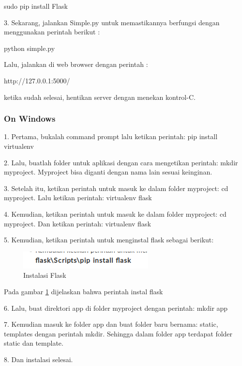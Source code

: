\documentclass[12pt,a4paper]{article}
\begin{document}
	sudo pip install Flask

3. Sekarang, jalankan Simple.py untuk memastikannya berfungsi dengan menggunakan perintah berikut :

	python simple.py

Lalu, jalankan di web browser dengan perintah :

http://127.0.0.1:5000/

ketika sudah selesai, hentikan server dengan menekan kontrol-C.
\subsubsection{On Windows}

1.	Pertama, bukalah command prompt lalu ketikan perintah: pip install virtualenv

2.	Lalu, buatlah folder untuk aplikasi dengan cara mengetikan perintah: mkdir myproject.
Myproject bisa diganti dengan nama lain sesuai keinginan.

3.	Setelah itu, ketikan perintah untuk masuk ke dalam folder myproject: cd myproject. Lalu ketikan perintah: virtualenv flask

4.	Kemudian, ketikan perintah untuk masuk ke dalam folder myproject: cd myproject. Dan ketikan perintah: virtualenv flask

5.	Kemudian, ketikan perintah untuk menginstal flask sebagai berikut:
\begin{figure}[ht]
\centerline{\includegraphics[scale=1]{../figures/3instal.png} }

\caption{Instalasi Flask} 
\label{Flask}
\end{figure}

Pada gambar \ref{Flask} dijelaskan bahwa perintah instal flask

6.	Lalu, buat direktori app di folder myproject dengan perintah: mkdir app

7.	Kemudian masuk ke folder app dan buat folder baru bernama: static, templates dengan perintah mkdir. Sehingga dalam folder app terdapat folder static dan template.

8.	Dan instalasi selesai.
\end{document}
